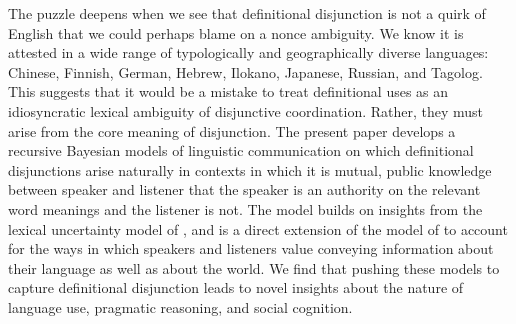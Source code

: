 The puzzle deepens when we see that definitional disjunction is not a
quirk of English that we could perhaps blame on a nonce ambiguity.  We
know it is attested in a wide range of typologically and
geographically diverse languages: Chinese, Finnish, German, Hebrew,
Ilokano, Japanese, Russian, and Tagolog.  This suggests that it would
be a mistake to treat definitional uses as an idiosyncratic lexical
ambiguity of disjunctive coordination. Rather, they must arise from
the core meaning of disjunction.  The present paper develops a
recursive Bayesian models of linguistic communication
\cite{Franke09DISS,Jaeger:2011,Frank:Goodman:2012} on which
definitional disjunctions arise naturally in contexts in which it is
mutual, public knowledge between speaker and listener that the speaker
is an authority on the relevant word meanings and the listener is not.
The model builds on insights from the lexical uncertainty model of
\cite{Bergen:Goodman:Levy:2012}, and is a direct extension of the
model of \cite{Smith:Goodman:Frank:2013} to account for the ways in
which speakers and listeners value conveying information about their
language as well as about the world. We find that pushing these models
to capture definitional disjunction leads to novel insights about the
nature of language use, pragmatic reasoning, and social cognition.




